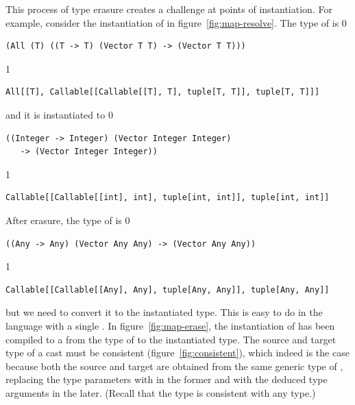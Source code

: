 \documentclass[7x10]{TimesAPriori_MIT}%
\def\racketEd{0}
\def\pythonEd{1}
\def\edition{0}
\numberwithin{theorem}{chapter}
\numberwithin{definition}{chapter}
\numberwithin{equation}{chapter}
\begin{document}
This process of type erasure creates a challenge at points of
instantiation. For example, consider the instantiation of
 in figure~\ref{fig:map-resolve}.
The type of  is
%
\if\edition\racketEd    
\begin{lstlisting}
(All (T) ((T -> T) (Vector T T) -> (Vector T T)))
\end{lstlisting}
\fi
\if\edition\pythonEd    
\begin{lstlisting}
All[[T], Callable[[Callable[[T], T], tuple[T, T]], tuple[T, T]]]
\end{lstlisting}
\fi
%
and it is instantiated to 
%
\if\edition\racketEd
\begin{lstlisting}
((Integer -> Integer) (Vector Integer Integer)
   -> (Vector Integer Integer))
\end{lstlisting}
\fi
\if\edition\pythonEd
\begin{lstlisting}
Callable[[Callable[[int], int], tuple[int, int]], tuple[int, int]]
\end{lstlisting}
\fi
%
After erasure, the type of  is
%
\if\edition\racketEd
\begin{lstlisting}
((Any -> Any) (Vector Any Any) -> (Vector Any Any))
\end{lstlisting}
\fi
\if\edition\pythonEd
\begin{lstlisting}
Callable[[Callable[[Any], Any], tuple[Any, Any]], tuple[Any, Any]]
\end{lstlisting}
\fi
%
but we need to convert it to the instantiated type.  This is easy to
do in the language \LangCast{} with a single .  In
figure~\ref{fig:map-erase}, the instantiation of  has been
compiled to a  from the type of  to the
instantiated type. The source and target type of a cast must be
consistent (figure~\ref{fig:consistent}), which indeed is the case
because both the source and target are obtained from the same generic
type of , replacing the type parameters with \CANYTY{} in
the former and with the deduced type arguments in the later. (Recall
that the \CANYTY{} type is consistent with any type.)
\end{document}
